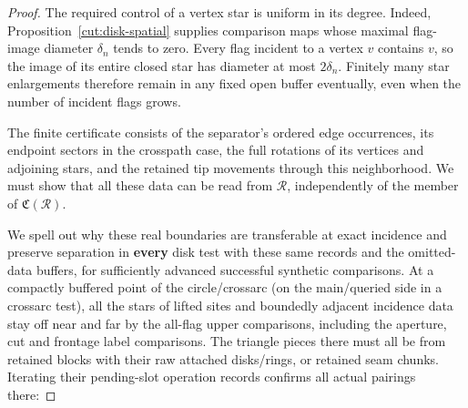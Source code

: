 \begin{proof}
The required control of a vertex star is uniform in its degree. Indeed,
Proposition~\ref{cut:disk-spatial} supplies comparison maps whose maximal
flag-image diameter $\delta_n$ tends to zero. Every flag incident to a vertex
$v$ contains $v$, so the image of its entire closed star has diameter at
most $2\delta_n$. Finitely many star enlargements therefore remain in any
fixed open buffer eventually, even when the number of incident flags grows.

The finite certificate consists of the separator's ordered edge
occurrences, its endpoint sectors in the crosspath case, the full rotations
of its vertices and adjoining stars, and the retained tip movements through
this neighborhood. We must show that all these data can be read from
$\mathcal R$, independently of the member of $\mathfrak C(\mathcal R)$.

We spell out why these real boundaries are transferable at exact incidence and preserve
separation in \textbf{every} disk test with these same records and the omitted-data
buffers, for sufficiently advanced successful synthetic comparisons. At a compactly
buffered point of the circle/crossarc (on the main/queried side in a crossarc test), all
the stars of lifted sites and boundedly adjacent incidence data stay off near and far by
the all-flag upper comparisons, including the aperture, cut and frontage label
comparisons. The triangle pieces there must all be from retained blocks with their raw
attached disks/rings, or retained seam chunks. Iterating their pending-slot operation
records confirms all actual pairings there:


\end{proof}
